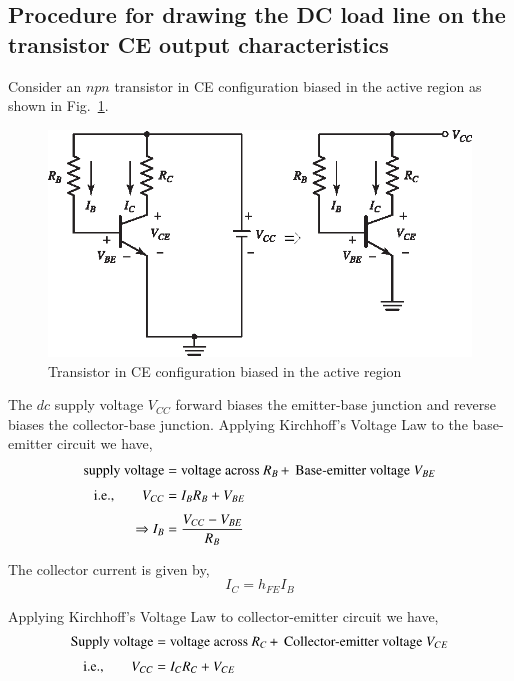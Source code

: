 \subsection{Procedure for drawing the DC load line on the transistor CE output characteristics}\label{sec4.1.2}

Consider an $npn$ transistor in CE configuration biased in the active region as shown in Fig.~\ref{fig4.1}.
\begin{figure}[H]
\centering
\includegraphics{chap3/S3-EE-03-035.eps}
\caption{Transistor in CE configuration biased in the active region}\label{fig4.1}
\end{figure}

The $dc$ supply voltage $V_{CC}$ forward biases the emitter-base junction and reverse biases the collector-base junction. Applying Kirchhoff's Voltage Law to the base-emitter circuit we have,
\begin{align}
\text{supply voltage} &= \text{voltage across $R_{B}\,+\,$ Base-emitter voltage $V_{BE}$}\notag\\[3pt]
\text{i.e.,}\qquad V_{CC} &= I_{B}R_{B}+V_{BE}\notag\\[3pt]
\Rightarrow I_{B} &= \frac{V_{CC}-V_{BE}}{R_{B}}\label{eq4.1}
\end{align}

The collector current is given by,
\begin{equation}
I_{C}=h_{FE}I_{B}\label{eq4.2}
\end{equation}

Applying Kirchhoff's Voltage Law to collector-emitter circuit we have,
\begin{align}
\text{Supply voltage} &= \text{voltage across $R_{C}\,+\,$ Collector-emitter voltage $V_{CE}$}\notag\\[3pt]
\text{i.e.,}\qquad V_{CC} &= I_{C}R_{C}+V_{CE}\label{eq4.3}
\end{align}

